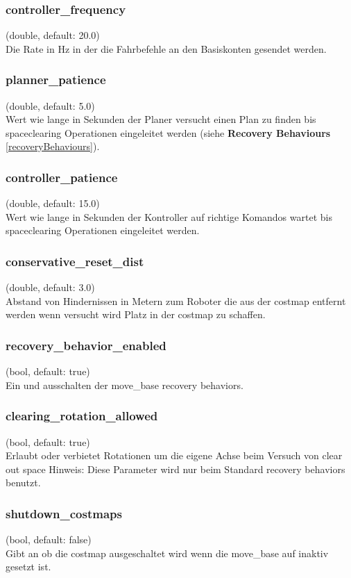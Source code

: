 \documentclass[oribibl]{llncs}
\begin{document}
\subsubsection{controller\_frequency} (double, default: 20.0)\\
	Die Rate in Hz in der die Fahrbefehle an den Basiskonten gesendet werden.
	
\subsubsection{planner\_patience} (double, default: 5.0)\\
	Wert wie lange in Sekunden der Planer versucht einen Plan zu finden bis spaceclearing Operationen eingeleitet werden (siehe \textbf{Recovery Behaviours} \ref{recoveryBehaviours}).
	
\subsubsection{controller\_patience} (double, default: 15.0)\\
	Wert wie lange in Sekunden der Kontroller auf richtige Komandos wartet bis spaceclearing Operationen eingeleitet werden.
	
\subsubsection{conservative\_reset\_dist} (double, default: 3.0)\\
	Abstand von Hindernissen in Metern zum Roboter die aus der costmap entfernt	werden wenn versucht wird Platz in der costmap zu schaffen.
	
\subsubsection{recovery\_behavior\_enabled} (bool, default: true)\\
	Ein und ausschalten der move\_base recovery behaviors.

\subsubsection{clearing\_rotation\_allowed} (bool, default: true)\\
	Erlaubt oder verbietet Rotationen um die eigene Achse beim Versuch von clear out space
	Hinweis: Diese Parameter wird nur beim Standard recovery behaviors benutzt.

\subsubsection{shutdown\_costmaps} (bool, default: false)\\
	Gibt an ob die costmap ausgeschaltet wird wenn die move\_base auf inaktiv gesetzt ist.
\end{document}
